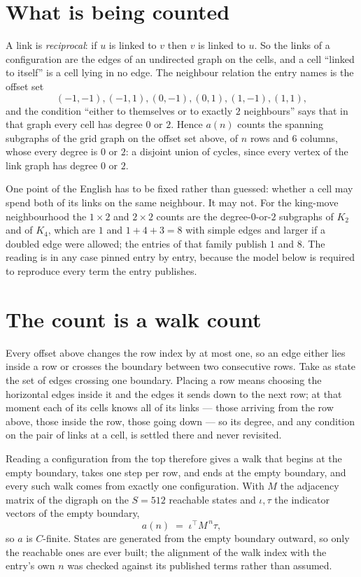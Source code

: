 \documentclass[11pt,a4paper]{article}
\theoremstyle{plain}
\theoremstyle{definition}
\begin{document}
\section{What is being counted}

A link is \emph{reciprocal}: if $u$ is linked to $v$ then $v$ is linked to $u$. So the links
of a configuration are the edges of an undirected graph on the cells, and a cell ``linked to
itself'' is a cell lying in no edge. The neighbour relation the entry names is the offset set
\[
(-1,-1), (-1,1), (0,-1), (0,1), (1,-1), (1,1),
\]
and the condition ``either to themselves or to exactly $2$ neighbours'' says that in that
graph every cell has degree $0$ or $2$. Hence $a(n)$ counts the spanning subgraphs of the
grid graph on the offset set above, of $n$ rows and $6$ columns,
whose every degree is $0$ or $2$: a disjoint union of cycles, since every vertex of the link graph has degree $0$ or $2$.

One point of the English has to be fixed rather than guessed: whether a cell may spend both of
its links on the same neighbour. It may not. For the king-move neighbourhood the $1\times2$
and $2\times2$ counts are the degree-$0$-or-$2$ subgraphs of $K_2$ and of $K_4$, which are $1$
and $1+4+3=8$ with simple edges and larger if a doubled edge were allowed; the entries of that
family publish $1$ and $8$. The reading is in any case pinned entry by entry, because the
model below is required to reproduce every term the entry publishes.


\section{The count is a walk count}

Every offset above changes the row index by at most one, so an edge either lies inside a row
or crosses the boundary between two consecutive rows. Take as state the set of edges crossing
one boundary. Placing a row means choosing the horizontal edges inside it and the edges it
sends down to the next row; at that moment each of its cells knows all of its links --- those
arriving from the row above, those inside the row, those going down --- so its degree, and any
condition on the pair of links at a cell, is settled there and never revisited.

Reading a configuration from the top therefore gives a walk that begins at the empty boundary,
takes one step per row, and ends at the empty boundary, and every such walk comes from exactly
one configuration. With $M$ the adjacency matrix of the digraph on the $S=512$ reachable
states and $\iota,\tau$ the indicator vectors of the empty boundary,
\[
a(n)\;=\;\iota^{\!\top}M^{\,n}\tau ,
\]
so $a$ is $C$-finite. States are generated from the empty boundary outward, so only the
reachable ones are ever built; the alignment of the walk index with the entry's own $n$ was
checked against its published terms rather than assumed.
\end{document}
